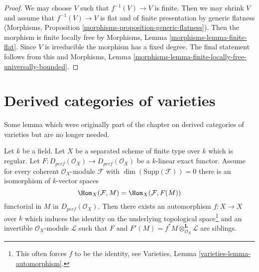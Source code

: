 \begin{proof}
We may choose $V$ such that $f^{-1}(V) \to V$ is finite.
Then we may shrink $V$ and assume that $f^{-1}(V) \to V$
is flat and of finite presentation by generic flatness
(Morphisms, Proposition \ref{morphisms-proposition-generic-flatness}).
Then the morphism is finite locally free by
Morphisms, Lemma \ref{morphisms-lemma-finite-flat}.
Since $V$ is irreducible the morphism has a fixed degree.
The final statement follows from this and
Morphisms, Lemma \ref{morphisms-lemma-finite-locally-free-universally-bounded}.
\end{proof}







\section{Derived categories of varieties}
\label{section-equiv}

\noindent
Some lemma which were originally part of the
chapter on derived categories of varieties but
are no longer needed.

\begin{lemma}
\label{lemma-preserves-Coh}
Let $k$ be a field. Let $X$ be a separated scheme of finite type over $k$ which
is regular. Let $F : D_{perf}(\mathcal{O}_X) \to D_{perf}(\mathcal{O}_X)$
be a $k$-linear exact functor. Assume for every coherent
$\mathcal{O}_X$-module $\mathcal{F}$ with $\dim(\text{Supp}(\mathcal{F})) = 0$
there is an isomorphism of $k$-vector spaces
$$
\Hom_X(\mathcal{F}, M) = \Hom_X(\mathcal{F}, F(M))
$$
functorial in $M$ in $D_{perf}(\mathcal{O}_X)$. Then there exists an
automorphism $f : X \to X$ over $k$ which induces the identity on the
underlying topological space\footnote{This often forces $f$
to be the identity, see Varieties, Lemma \ref{varieties-lemma-automorphism}.}
and an invertible $\mathcal{O}_X$-module $\mathcal{L}$
such that $F$ and $F'(M) = f^*M \otimes_{\mathcal{O}_X}^\mathbf{L} \mathcal{L}$
are siblings.
\end{lemma}

